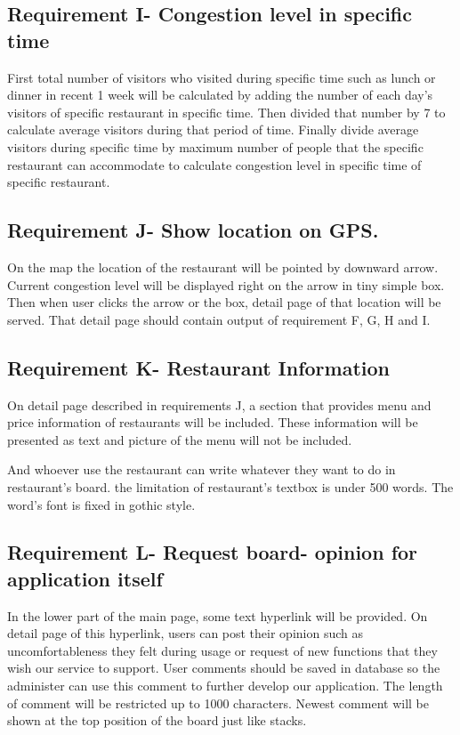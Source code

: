 \documentclass[journal]{IEEEtran}
\begin{document}
\subsection{Requirement I- Congestion level in specific time}
First total number of visitors who visited during specific time such as lunch or dinner in recent 1 week will be calculated by adding the number of each day’s visitors of specific restaurant in specific time. Then divided that number by 7 to calculate average visitors during that  period of time. Finally divide average visitors during specific time by maximum number of people that the specific restaurant can accommodate to calculate congestion level in specific time of specific restaurant.
\subsection{Requirement J- Show location on GPS.}
On the map the location of the restaurant will be pointed by downward arrow. Current congestion level will be displayed right on the arrow in tiny simple box. Then when user clicks the arrow or the box, detail page of that location will be served. That detail page should contain output of requirement F, G, H and I.
\subsection{Requirement K- Restaurant Information}
On detail page described in requirements J, a section that provides menu and price information of restaurants will be included. These information will be presented as text and picture of the menu will not be included.

 And whoever use the restaurant can write whatever they want to do in restaurant’s board. the limitation of restaurant’s textbox is under 500 words. The word’s font is fixed in gothic style. 

\subsection{Requirement L- Request board- opinion for application itself}
In the lower part of the main page, some text hyperlink will be provided. On detail page of this hyperlink, users can post their opinion such as uncomfortableness they felt during usage or request of new functions that they wish our service to support. 
User comments should be saved in database so the administer can use this comment to further develop our application. The length of comment will be restricted up to 1000 characters. Newest comment will be shown at the top position of the board just like stacks.
\end{document}
